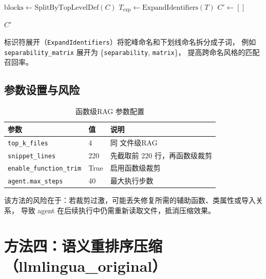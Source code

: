 \begin{algorithm}[H]
\caption{FunctionLevelTrimmer：函数级代码裁剪}
\label{alg:func-trim}

\BlankLine
$\text{blocks} \leftarrow \text{SplitByTopLevelDef}(C)$ 
$T_{\text{exp}} \leftarrow \text{ExpandIdentifiers}(T)$ 
$C' \leftarrow []$\;

\BlankLine
{}
\Return $C'$\;
\end{algorithm}

标识符展开（\texttt{ExpandIdentifiers}）将驼峰命名和下划线命名拆分成子词，
例如 \texttt{separability\_matrix} 展开为 \{\texttt{separability}, \texttt{matrix}\}，
提高跨命名风格的匹配召回率。

\subsection{参数设置与风险}

\begin{table}[htbp]
\centering
\caption{函数级RAG 参数配置}
\label{tab:ragfunc-params}
\begin{tabular}{lll}
\toprule
参数 & 值 & 说明 \\
\midrule
\texttt{top\_k\_files} & 4 & 同 文件级RAG \\
\texttt{snippet\_lines} & 220 & 先截取前 220 行，再函数级裁剪 \\
\texttt{enable\_function\_trim} & True & 启用函数级裁剪 \\
\texttt{agent.max\_steps} & 40 & 最大执行步数 \\
\bottomrule
\end{tabular}
\end{table}

该方法的风险在于：若裁剪过激，可能丢失修复所需的辅助函数、类属性或导入关系，
导致 agent 在后续执行中仍需重新读取文件，抵消压缩效果。

\section{方法四：语义重排序压缩（llmlingua\_original）}
\label{sec:llmlingua}

